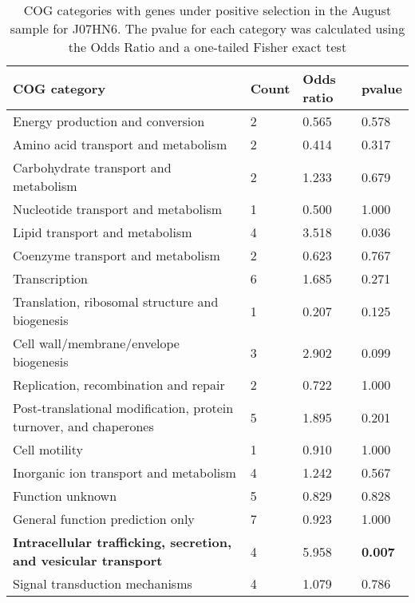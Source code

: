 \begin{table}[hb]
\footnotesize 
	\tabcolsep=0.11cm 
\caption{COG categories with genes under positive selection in the August sample for J07HN6. The pvalue for each category was calculated using the Odds Ratio and a one-tailed Fisher exact test} 
\begin{tabularx}{\textwidth}{L{6cm}R{2cm}R{2cm}R{2cm}} 
\hline 
\textbf{COG category} & \textbf{Count} & \textbf{Odds ratio} & \textbf{pvalue} \\ 
\hline 
Energy production and conversion & 2 & 0.565 & 0.578 \\ 
Amino acid transport and metabolism & 2 & 0.414 & 0.317 \\ 
Carbohydrate transport and metabolism & 2 & 1.233 & 0.679 \\ 
Nucleotide transport and metabolism & 1 & 0.500 & 1.000 \\ 
Lipid transport and metabolism & 4 & 3.518 & 0.036 \\ 
Coenzyme transport and metabolism & 2 & 0.623 & 0.767 \\ 
Transcription & 6 & 1.685 & 0.271 \\ 
Translation, ribosomal structure and biogenesis & 1 & 0.207 & 0.125 \\ 
Cell wall/membrane/envelope biogenesis & 3 & 2.902 & 0.099 \\ 
Replication, recombination and repair & 2 & 0.722 & 1.000 \\ 
Post-translational modification, protein turnover, and chaperones & 5 & 1.895 & 0.201 \\ 
Cell motility & 1 & 0.910 & 1.000 \\ 
Inorganic ion transport and metabolism & 4 & 1.242 & 0.567 \\ 
Function unknown & 5 & 0.829 & 0.828 \\ 
General function prediction only & 7 & 0.923 & 1.000 \\ 
\textbf{Intracellular trafficking, secretion, and vesicular transport} & 4 & 5.958 & \textbf{0.007} \\ 
Signal transduction mechanisms & 4 & 1.079 & 0.786 \\ 
\end{tabularx} 
\label{August_COG_Selection_J07HN6} 
 \end{table} 

